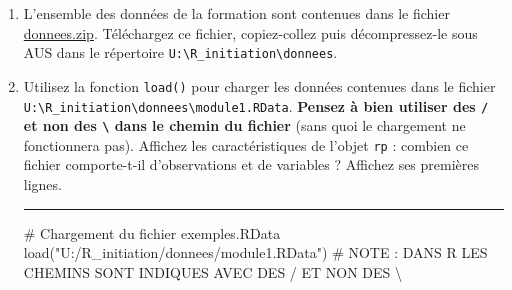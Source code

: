 \documentclass[12pt,twosided, notitlepage]{book}
\newenvironment{Shaded}{}{}
\newcommand{\KeywordTok}[1]{\textcolor[rgb]{0.00,0.00,1.00}{{#1}}}
\newcommand{\StringTok}[1]{\textcolor[rgb]{0.00,0.50,0.50}{{#1}}}
\newcommand{\CommentTok}[1]{\textcolor[rgb]{0.00,0.50,0.00}{{#1}}}
\newcommand{\NormalTok}[1]{{#1}}
\newif \ifsol
\renewenvironment{Shaded}{\begin{snugshade}}{\end{snugshade}}
\begin{document}
\begin{enumerate}
\def\labelenumi{\alph{enumi}.}
\item
  L'ensemble des données de la formation sont contenues dans le fichier
  \href{http://r.slmc.fr/donnees.zip}{donnees.zip}. Téléchargez ce
  fichier, copiez-collez puis décompressez-le sous AUS dans le
  répertoire
  \texttt{U:\textbackslash{}R\_initiation\textbackslash{}donnees}.
\item
  Utilisez la fonction \texttt{load()} pour charger
  les données contenues dans le fichier
  \texttt{U:\textbackslash{}R\_initiation\textbackslash{}donnees\textbackslash{}module1.RData}.
  \textbf{Pensez à bien utiliser des \texttt{/} et non des
  \texttt{\textbackslash{}} dans le chemin du fichier} (sans quoi le
  chargement ne fonctionnera pas). Affichez les caractéristiques de
  l'objet \texttt{rp} : combien ce fichier comporte-t-il d'observations
  et de variables ? Affichez ses premières lignes.

  \ifsol 

  \begin{center} \rule{0.5\linewidth}{\linethickness}\end{center}

\begin{Shaded}
\begin{Highlighting}[]
\CommentTok{# Chargement du fichier exemples.RData}
\KeywordTok{load}\NormalTok{(}\StringTok{"U:/R_initiation/donnees/module1.RData"}\NormalTok{)}
\CommentTok{# NOTE : DANS R LES CHEMINS SONT INDIQUES AVEC DES / ET NON DES \textbackslash{}}
\end{Highlighting}
\end{Shaded}

\begin{Shaded}
\end{Shaded}
\end{enumerate}
\end{document}

